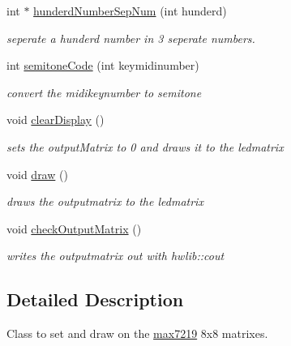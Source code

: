 \begin{DoxyCompactItemize}
int $\ast$ \hyperlink{classlight_music_1_1max7219_a90bb4806e930ccfac74ca33c7716fc3f}{hunderd\+Number\+Sep\+Num} (int hunderd)
\begin{DoxyCompactList}\small\item\em seperate a hunderd number in 3 seperate numbers. \end{DoxyCompactList}\item 
int \hyperlink{classlight_music_1_1max7219_a6e3db6f8018bc2b3248a1226e4e07682}{semitone\+Code} (int keymidinumber)
\begin{DoxyCompactList}\small\item\em convert the midikeynumber to semitone \end{DoxyCompactList}\item 
\mbox{\label{classlight_music_1_1max7219_a483ed3b3de5d4aff64eb1b133cd35688}} 
void \hyperlink{classlight_music_1_1max7219_a483ed3b3de5d4aff64eb1b133cd35688}{clear\+Display} ()
\begin{DoxyCompactList}\small\item\em sets the output\+Matrix to 0 and draws it to the ledmatrix \end{DoxyCompactList}\item 
\mbox{\label{classlight_music_1_1max7219_a36ac65282e84e7ed37470a93af3bce6b}} 
void \hyperlink{classlight_music_1_1max7219_a36ac65282e84e7ed37470a93af3bce6b}{draw} ()
\begin{DoxyCompactList}\small\item\em draws the outputmatrix to the ledmatrix \end{DoxyCompactList}\item 
\mbox{\label{classlight_music_1_1max7219_aa9356c5bb77c6a020c474454e8860058}} 
void \hyperlink{classlight_music_1_1max7219_aa9356c5bb77c6a020c474454e8860058}{check\+Output\+Matrix} ()
\begin{DoxyCompactList}\small\item\em writes the outputmatrix out with hwlib\+::cout \end{DoxyCompactList}\end{DoxyCompactItemize}


\subsection{Detailed Description}
Class to set and draw on the \hyperlink{classlight_music_1_1max7219}{max7219} 8x8 matrixes. 

